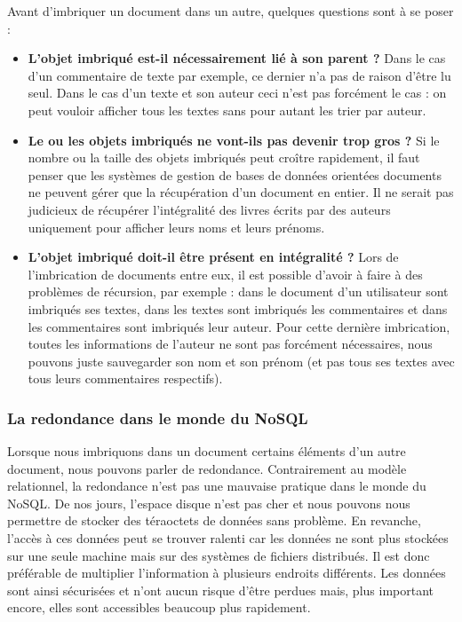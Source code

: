 	Avant d'imbriquer un document dans un autre, quelques questions sont à se poser :
	\vspace{10px}
	\begin{itemize}
		\item \textbf{L'objet imbriqué est-il nécessairement lié à son parent ?} Dans le cas d'un commentaire de texte par exemple, ce dernier n'a pas de raison d'être lu seul. Dans le cas d'un texte et son auteur ceci n'est pas forcément le cas : on peut vouloir afficher tous les textes sans pour autant les trier par auteur.
		\item \textbf{Le ou les objets imbriqués ne vont-ils pas devenir trop gros ?} Si le nombre ou la taille des objets imbriqués peut croître rapidement, il faut penser que les systèmes de gestion de bases de données orientées documents ne peuvent gérer que la récupération d'un document en entier. Il ne serait pas judicieux de récupérer l'intégralité des livres écrits par des auteurs uniquement pour afficher leurs noms et leurs prénoms.
		\item \textbf{L'objet imbriqué doit-il être présent en intégralité ?} Lors de l'imbrication de documents entre eux, il est possible d'avoir à faire à des problèmes de récursion, par exemple : dans le document d'un utilisateur sont imbriqués ses textes, dans les textes sont imbriqués les commentaires et dans les commentaires sont imbriqués leur auteur. Pour cette dernière imbrication, toutes les informations de l'auteur ne sont pas forcément nécessaires, nous pouvons juste sauvegarder son nom et son prénom (et pas tous ses textes avec tous leurs commentaires respectifs).
	\end{itemize}

\subsubsection{La redondance dans le monde du NoSQL}

	Lorsque nous imbriquons dans un document certains éléments d'un autre document, nous pouvons parler de redondance. Contrairement au modèle relationnel, la redondance n'est pas une mauvaise pratique dans le monde du NoSQL. De nos jours, l'espace disque n'est pas cher et nous pouvons nous permettre de stocker des téraoctets de données sans problème. En revanche, l'accès à ces données peut se trouver ralenti car les données ne sont plus stockées sur une seule machine mais sur des systèmes de fichiers distribués. Il est donc préférable de multiplier l'information à plusieurs endroits différents. Les données sont ainsi sécurisées et n'ont aucun risque d'être perdues mais, plus important encore, elles sont accessibles beaucoup plus rapidement.\\

